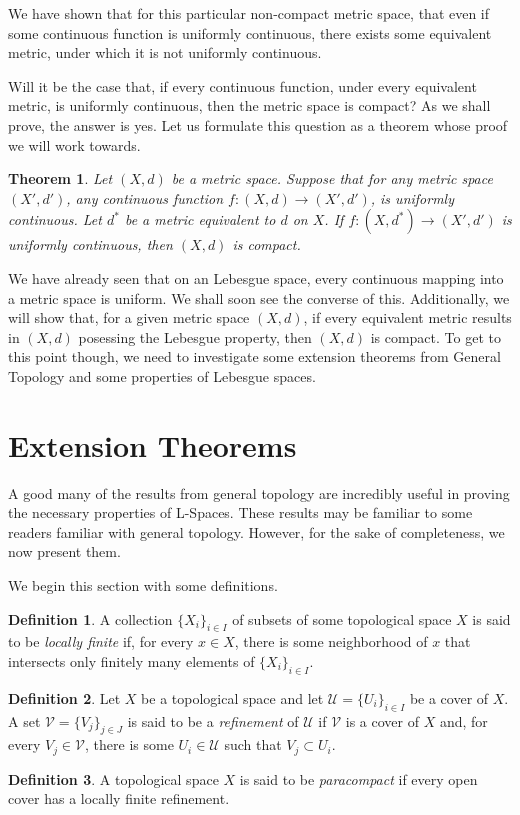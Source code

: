 \documentclass[openany, amssymb, psamsfonts]{amsart}
\newtheorem{thm}{Theorem}[section]
\theoremstyle{definition}
\newtheorem{defn}{Definition}[section]
\numberwithin{equation}{section}
\begin{document}
We have shown that for this particular non-compact metric space, that even if some continuous function is uniformly continuous, there exists some equivalent metric, under which it is not uniformly continuous. 

Will it be the case that, if every continuous function, under every equivalent metric, is uniformly continuous, then the metric space is compact? As we shall prove, the answer is yes. Let us formulate this question as a theorem whose proof we will work towards.

\begin{thm} \label{thm:2.3}
  Let $(X,d)$ be a metric space. Suppose that for any metric space $(X', d')$, any continuous function $f:(X,d) \to (X', d')$, is uniformly continuous. Let $d^\ast$ be a metric equivalent to $d$  on $X$. If $f:(X, d^\ast) \to (X', d')$ is uniformly continuous, then $(X,d)$ is compact. 
\end{thm}

We have already seen that on an Lebesgue space, every continuous mapping into a metric space is uniform. We shall soon see the converse of this. Additionally, we will show that, for a given metric space $(X,d)$, if every equivalent metric results in $(X,d)$ posessing the Lebesgue property, then $(X,d)$ is compact. To get to this point though, we need to investigate some extension theorems from General Topology and some properties of Lebesgue spaces.

\section{Extension Theorems}

A good many of the results from general topology are incredibly useful in proving the necessary properties of L-Spaces. These results may be familiar to some readers familiar with general topology. However, for the sake of completeness, we now present them. 

We begin this section with some definitions. 
\begin{defn}
  A collection $\{X_i\}_{i\in I}$ of subsets of some topological space $X$ is said to be \emph{locally finite} if, for every $x \in X$, there is some neighborhood of $x$ that intersects only finitely many elements of $\{X_i\}_{i\in I}$. 
\end{defn}
\begin{defn}
  Let $X$ be a topological space and let $\mathcal{U} = \{U_i\}_{i\in I}$ be a cover of $X$. A set $\mathcal{V} = \{V_j\}_{j\in J}$ is said to be a \emph{refinement} of $\mathcal{U}$ if $\mathcal{V}$ is a cover of $X$ and, for every $V_j \in \mathcal{V}$, there is some $U_i \in \mathcal{U}$ such that $V_j \subset U_i$.
\end{defn}
\begin{defn}
  A topological space $X$ is said to be \emph{paracompact} if every open cover has a locally finite refinement.
\end{defn}
\end{document}
